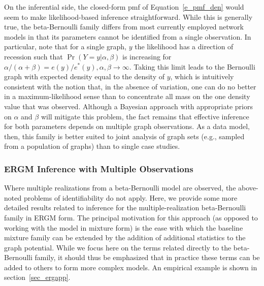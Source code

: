 \documentclass[11pt]{article}
\begin{document}
On the inferential side, the closed-form pmf of Equation~\ref{e_pmf_den} would seem to make likelihood-based inference straightforward.  While this is generally true, the beta-Bernoulli family differs from most currently employed network models in that its parameters cannot be identified from a single observation.  In particular, note that for a single graph, $y$ the likelihood has a direction of recession such that $\Pr(Y=y|\alpha,\beta)$ is increasing for $\alpha/(\alpha+\beta)=e(y)/e^*(y), \alpha,\beta \to \infty$.  Taking this limit leads to the Bernoulli graph with expected density equal to the density of $y$, which is intuitively consistent with the notion that, in the absence of variation, one can do no better in a maximum-likelihood sense than to concentrate all mass on the one density value that was observed.  Although a Bayesian approach with appropriate priors on $\alpha$ and $\beta$ will mitigate this problem, the fact remains that effective inference for both parameters depends on multiple graph observations.  As a data model, then, this family is better suited to joint analysis of graph sets (e.g., sampled from a population of graphs) than to single case studies.

\subsubsection{ERGM Inference with Multiple Observations} \label{sec_ergm_beta}

Where multiple realizations from a beta-Bernoulli model are observed, the above-noted problems of identifiability do not apply.  Here, we provide some more detailed results related to inference for the multiple-realization beta-Bernoulli family in ERGM form.  The principal motivation for this approach (as opposed to working with the model in mixture form) is the ease with which the baseline mixture family can be extended by the addition of additional statistics to the graph potential.  While we focus here on the terms related directly to the beta-Bernoulli family, it should thus be emphasized that in practice these terms can be added to others \citep[see, e.g.][for examples]{wasserman.pattison:p:1996,snijders.et.al:sm:2006} to form more complex models.  An empirical example is shown in section~\ref{sec_ergapp}.
\end{document}
